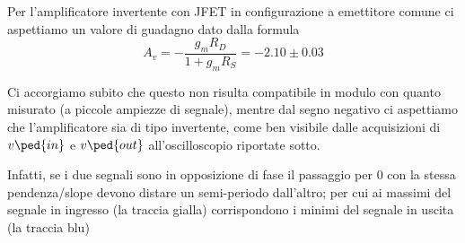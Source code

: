 \documentclass[10pt, a4paper, italian]{article}
\begin{document}
Per l'amplificatore invertente con JFET in configurazione a emettitore comune
ci aspettiamo un valore di guadagno dato dalla formula
\begin{equation}\label{eq: Av}
A_v = -\frac{g_m R_D}{1 + g_m R_S} = -2.10 \pm 0.03
\end{equation}

Ci accorgiamo subito che questo non risulta compatibile in modulo con quanto
misurato (a piccole ampiezze di segnale), mentre dal segno negativo ci
aspettiamo che l'amplificatore sia di tipo invertente, come ben visibile dalle
acquisizioni di $v\ped{in}$ e $v\ped{out}$ all'oscilloscopio riportate sotto.

Infatti, se i due segnali sono in opposizione di fase il passaggio per 0 con
la stessa pendenza/slope devono distare un semi-periodo dall'altro; per cui ai
massimi del segnale in ingresso (la traccia gialla) corrispondono i minimi del
segnale in uscita (la traccia blu)
\end{document}
